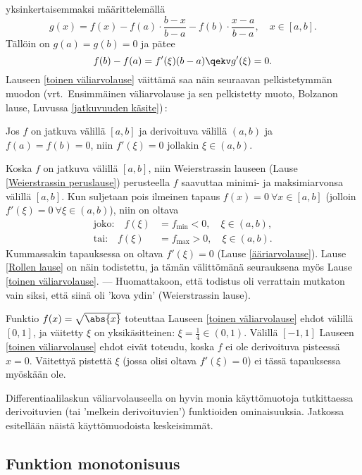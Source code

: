 yksinkertaisemmaksi määrittelemällä
\[
g(x)=f(x)-f(a)\cdot\frac{b-x}{b-a}-f(b)\cdot\frac{x-a}{b-a}, \quad x\in [a,b].
\]
Tällöin on $g(a)=g(b)=0$ ja pätee
\[
f(b)-f(a) = f'(\xi)(b-a) \qekv g'(\xi) = 0.
\]
Lauseen \ref{toinen väliarvolause} väittämä saa näin seuraavan pelkistetymmän muodon 
(vrt.\ Ensimmäinen väliarvolause ja sen pelkistetty muoto, Bolzanon lause, Luvussa 
\ref{jatkuvuuden käsite})\,:
\begin{Lause} \label{Rollen lause}  
Jos $f$ on jatkuva välillä $[a,b]$ ja derivoituva välillä $(a,b)$ ja $f(a)=f(b)=0$, niin
$f'(\xi)=0$ jollakin $\xi\in (a,b)$. 
\end{Lause}
\tod Koska $f$ on jatkuva välillä $[a,b]$, niin Weierstrassin lauseen 
(Lause \ref{Weierstrassin peruslause}) perusteella $f$ saavuttaa minimi- ja maksimiarvonsa 
välillä $[a,b]$. Kun suljetaan pois ilmeinen tapaus $f(x)=0 \ \forall x\in [a,b]$ (jolloin
$f'(\xi)=0 \ \forall \xi\in (a,b)$), niin on oltava
\begin{align*}
\text{joko:} \quad f(\xi) &= f_{\text{min}}<0, \quad \xi\in (a,b), \\
\text{tai:} \quad f(\xi) &= f_{\text{max}}>0, \quad \xi\in (a,b).
\end{align*}
Kummassakin tapauksessa on oltava $f'(\xi)=0$ (Lause \ref{ääriarvolause}). Lause 
\ref{Rollen lause} on näin todistettu, ja tämän välittömänä seurauksena myös Lause 
\ref{toinen väliarvolause}. --- Huomattakoon, että todistus oli verrattain mutkaton vain siksi, 
että siinä oli 'kova ydin' (Weierstrassin lause). \loppu
\begin{Exa} Funktio $f(x)=\sqrt{\abs{x}}$ toteuttaa Lauseen \ref{toinen väliarvolause} ehdot
välillä $[0,1]$, ja väitetty $\xi$ on yksikäsitteinen: $\xi=\tfrac{1}{4}\in(0,1)$. Välillä
$[-1,1]$ Lauseen \ref{toinen väliarvolause} ehdot eivät toteudu, koska $f$ ei ole derivoituva
pisteessä $x=0$. Väitettyä pistettä $\xi$ (jossa olisi oltava $f'(\xi)=0$) ei tässä tapauksessa
myöskään ole. \loppu
\end{Exa}
Differentiaalilaskun väliarvolauseella on hyvin monia käyttömuotoja tutkittaessa derivoituvien
(tai 'melkein derivoituvien') funktioiden ominaisuuksia. Jatkossa esitellään näistä 
käyttömuodoista keskeisimmät.

\subsection*{Funktion monotonisuus}
 

